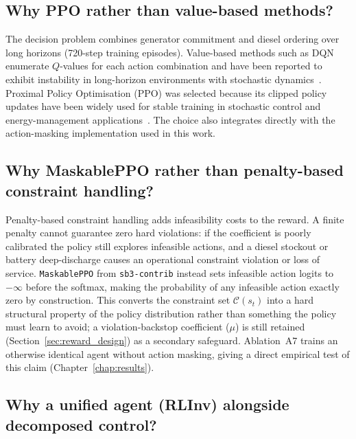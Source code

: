 \subsection{Why PPO rather than value-based methods?}

The decision problem combines generator commitment and diesel ordering over
long horizons (720-step training episodes). Value-based methods such as DQN
enumerate $Q$-values for each action combination and have been reported to
exhibit
instability in long-horizon environments with stochastic
dynamics~\citep{mnih2015humanlevel}. Proximal Policy Optimisation (PPO) was
selected because its clipped
policy updates have been widely used for stable training in stochastic
control and energy-management
applications~\citep{schulman2017proximal,perera2021application,zhang2021deep}.
The choice also integrates directly with the action-masking implementation
used in this work.

\subsection{Why MaskablePPO rather than penalty-based constraint handling?}

Penalty-based constraint handling adds infeasibility costs to the reward.
A finite penalty cannot guarantee zero hard violations: if the coefficient
is poorly calibrated the policy still explores infeasible actions, and a
diesel stockout or battery deep-discharge causes an operational constraint
violation or loss of service. \texttt{MaskablePPO} from \texttt{sb3-contrib}
instead sets infeasible action logits to $-\infty$ before the softmax, making
the probability of any infeasible action exactly zero by construction. This
converts the constraint set $\mathcal{C}(s_t)$ into a hard structural
property of the policy distribution rather than something the policy must
learn to avoid; a violation-backstop coefficient ($\mu$) is still retained
(Section~\ref{sec:reward_design}) as a secondary safeguard. Ablation~A7
trains an otherwise identical agent without action masking, giving a direct
empirical test of this claim (Chapter~\ref{chap:results}).

\subsection{Why a unified agent (RLInv) alongside decomposed control?}

